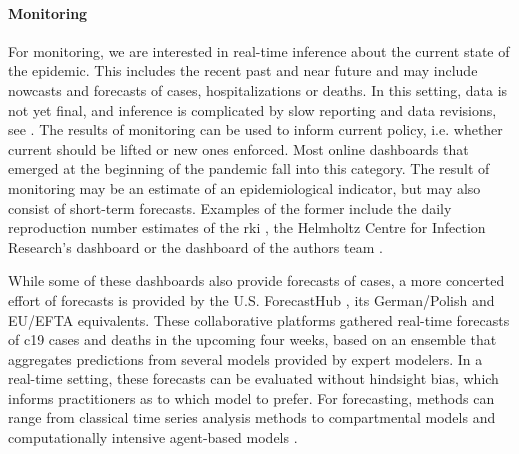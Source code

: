 \paragraph{Monitoring}
For monitoring, we are interested in real-time inference about the current state of the epidemic. This includes the recent past and near future and may include nowcasts and forecasts of cases, hospitalizations or deaths. In this setting, data is not yet final, and inference is complicated by slow reporting and data revisions, see . The results of monitoring can be used to inform current policy, i.e. whether current  should be lifted or new ones enforced. Most online dashboards that emerged at the beginning of the pandemic fall into this category. The result of monitoring may be an estimate of an epidemiological indicator, but may also consist of short-term forecasts. Examples of the former include the daily reproduction number estimates of the \acrshort{rki} \citep{AnDerHeiden2020Schatzung}, the Helmholtz Centre for Infection Research's dashboard \citep{Khailaie2021Development} or the dashboard of the authors team \citep{Hotz2020Monitoring}.

While some of these dashboards also provide forecasts of cases, a more concerted effort of forecasts is provided by the U.S. ForecastHub \citep{Ray2020Ensemble}, its German/Polish \citep{Bracher2021Preregistered,Bracher2022National} and EU/EFTA \citep{Sherratt2022Predictive} equivalents. These collaborative platforms gathered real-time forecasts of \acrshort{c19} cases and deaths in the upcoming four weeks, based on an ensemble that aggregates predictions from several models provided by expert modelers. In a real-time setting, these forecasts can be evaluated without hindsight bias, which informs practitioners as to which model to prefer. 
For forecasting, methods can range from classical time series analysis methods \citep{Arroyo-Marioli2021Tracking} to compartmental models \citep{Khailaie2021Development} and computationally intensive agent-based models \citep{Adamik2020Mitigation}.

